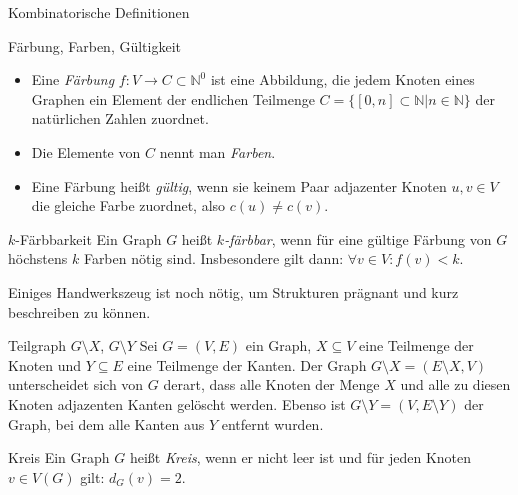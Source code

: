 \begin{section}{Kombinatorische Definitionen}
  \begin{definition}{Färbung, Farben, Gültigkeit}
   \-\ 
   \begin{itemize}
   \item Eine \textit{Färbung} $f: V \rightarrow C \subset \mathbb{N}^0$ ist eine Abbildung, die jedem Knoten eines Graphen ein Element der endlichen Teilmenge $C = \{[0,n] \subset \mathbb{N}| n \in \mathbb{N}\}$ der natürlichen Zahlen zuordnet. 
   \item Die Elemente von $C$ nennt man \textit{Farben}. 
   \item Eine Färbung heißt \textit{gültig}, wenn sie keinem Paar adjazenter Knoten $u,v \in V$ die gleiche Farbe zuordnet, also $c(u) \neq c(v)$. 
   \end{itemize}
  \end{definition}
  
  \begin{definition}{$k$-Färbbarkeit}
   Ein Graph $G$ heißt \textit{$k$-färbbar}, wenn für eine gültige Färbung von $G$ höchstens $k$ Farben nötig sind. Insbesondere gilt dann: $\forall v \in V: f(v) < k$.
  \end{definition}
  
  Einiges Handwerkszeug ist noch nötig, um Strukturen prägnant und kurz beschreiben zu können.
  
  \begin{definition}{Teilgraph $G\setminus X$, $G\setminus Y$}
   Sei $G=(V,E)$ ein Graph, $X \subseteq V$ eine Teilmenge der Knoten und $Y \subseteq E$ eine Teilmenge der Kanten. Der Graph $G\setminus X = (E\setminus X,V)$ unterscheidet sich von $G$ derart, dass alle Knoten der Menge $X$ und alle zu diesen Knoten adjazenten Kanten gelöscht werden. Ebenso ist $G\setminus Y = (V,E\setminus Y)$ der Graph, bei dem alle Kanten aus $Y$ entfernt wurden.
  \end{definition}
  
  \begin{definition}{Kreis}
   Ein Graph $G$ heißt \textit{Kreis}, wenn er nicht leer ist und für jeden Knoten $v\in V(G)$ gilt: $d_G(v) = 2$.
  \end{definition}
\end{section}
